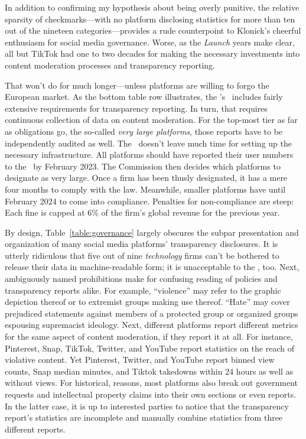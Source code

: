 In addition to confirming my hypothesis about being overly punitive, the
relative sparsity of checkmarks---with no platform disclosing statistics for
more than ten out of the nineteen categories---provides a rude counterpoint to
Klonick's cheerful enthusiasm for social media governance. Worse, as the
\emph{Launch} years make clear, all but TikTok had one to two decades for making
the necessary investments into content moderation processes and transparency
reporting.

That won't do for much longer---unless platforms are willing to forgo the
European market. As the bottom table row illustrates, the \EU's \DSA\ includes
fairly extensive requirements for transparency reporting. In turn, that requires
continuous collection of data on content moderation. For the top-most tier as
far as obligations go, the so-called \emph{very large platforms}, those reports
have to be independently audited as well. The \DSA\ doesn't leave much time for
setting up the necessary infrastructure. All platforms should have reported
their user numbers to the \EU\ by February 2023. The Commission then decides
which platforms to designate as very large. Once a firm has been thusly
designated, it has a mere four months to comply with the law. Meanwhile, smaller
platforms have until February 2024 to come into compliance. Penalties for
non-compliance are steep: Each fine is capped at 6\% of the firm's global
revenue for the previous year.

By design, Table~\ref{table:governance} largely obscures the subpar presentation
and organization of many social media platforms' transparency disclosures. It is
utterly ridiculous that five out of nine \emph{technology} firms can't be
bothered to release their data in machine-readable form; it is unacceptable to
the \EU, too. Next, ambiguously named prohibitions make for confusing reading of
policies and transparency reports alike. For example, ``violence'' may refer to
the graphic depiction thereof or to extremist groups making use thereof.
``Hate'' may cover prejudiced statements against members of a protected group or
organized groups espousing supremacist ideology. Next, different platforms
report different metrics for the same aspect of content moderation, if they
report it at all. For instance, Pinterest, Snap, TikTok, Twitter, and YouTube
report statistics on the reach of violative content. Yet Pinterest, Twitter, and
YouTube report binned view counts, Snap median minutes, and Tiktok takedowns
within 24 hours as well as without views. For historical, reasons, most
platforms also break out government requests and intellectual property claims
into their own sections or even reports. In the latter case, it is up to
interested parties to notice that the transparency report's statistics are
incomplete and manually combine statistics from three different reports.

